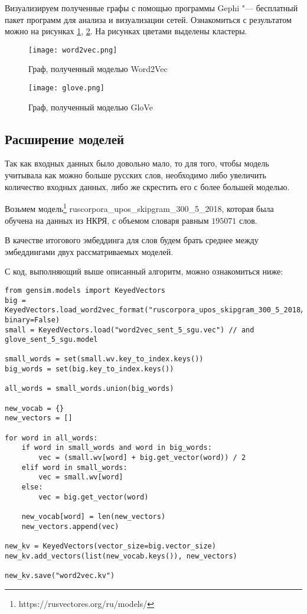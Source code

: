 \documentclass[coursework]{SCWorks}
\begin{document}
Визуализируем полученные графы с помощью программы Gephi "--- бесплатный пакет программ для анализа и визуализации сетей. Ознакомиться с результатом можно на рисунках \ref{fig:graph-word2vec}, \ref{fig:graph-glove}. На рисунках цветами выделены кластеры.

\begin{figure}[!ht]
    \centering
    \texttt{[image: word2vec.png]}
    \caption{Граф, полученный моделью Word2Vec}
    \label{fig:graph-word2vec}
\end{figure}

\begin{figure}[!ht]
    \centering
    \texttt{[image: glove.png]}
    \caption{Граф, полученный моделью GloVe}
    \label{fig:graph-glove}
\end{figure}

\subsection{Расширение моделей}

Так как входных данных было довольно мало, то для того, чтобы модель учитывала как можно больше русских слов, необходимо либо увеличить количество входных данных, либо же скрестить его с более большей моделью. 

Возьмем модель\footnote{https://rusvectores.org/ru/models/} ruscorpora\_upos\_skipgram\_300\_5\_2018, которая была обучена на данных из НКРЯ, с объемом словаря равным $195 071$ слов.

В качестве итогового эмбеддинга для слов будем брать среднее между эмбеддингами двух рассматриваемых моделей.

С код, выполняющий выше описанный алгоритм, можно ознакомиться ниже:
\begin{verbatim}
from gensim.models import KeyedVectors
big = KeyedVectors.load_word2vec_format("ruscorpora_upos_skipgram_300_5_2018/model.vec", binary=False)
small = KeyedVectors.load("word2vec_sent_5_sgu.vec") // and glove_sent_5_sgu.model

small_words = set(small.wv.key_to_index.keys())
big_words = set(big.key_to_index.keys())

all_words = small_words.union(big_words)

new_vocab = {}
new_vectors = []

for word in all_words:
    if word in small_words and word in big_words:
        vec = (small.wv[word] + big.get_vector(word)) / 2
    elif word in small_words:
        vec = small.wv[word]
    else:
        vec = big.get_vector(word)

    new_vocab[word] = len(new_vectors)
    new_vectors.append(vec)

new_kv = KeyedVectors(vector_size=big.vector_size)
new_kv.add_vectors(list(new_vocab.keys()), new_vectors)

new_kv.save("word2vec.kv")
\end{verbatim}
\end{document}
